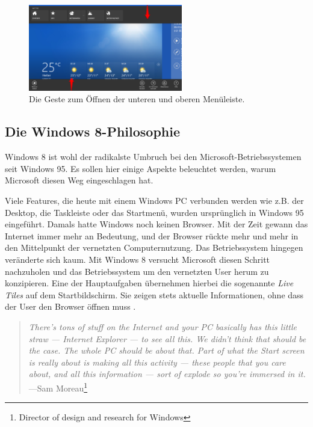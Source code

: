 \documentclass[12pt,a4paper,bibtotoc,abstracton]{scrartcl}
\begin{document}
\begin{figure}[h]	
	\centering
	\includegraphics[width=0.6\textwidth]{Bilder/Screenshots/windows8/app_leisten.png} 
	\caption{Die Geste zum Öffnen der unteren und oberen Menüleiste.}
	\label{fig:menubar}
\end{figure}  

\subsection{Die Windows 8-Philosophie}
\label{subsec:win8philosophie}
Windows 8 ist wohl der radikalste Umbruch bei den Microsoft-Betriebssystemen seit Windows 95. Es sollen hier einige Aspekte beleuchtet werden, warum Microsoft diesen Weg eingeschlagen hat.

Viele Features, die heute mit einem Windows PC verbunden werden wie z.B. der Desktop, die Taskleiste oder das Startmenü, wurden ursprünglich in Windows 95 eingeführt. Damals hatte Windows noch keinen Browser. Mit der Zeit gewann das Internet immer mehr an Bedeutung, und der Browser rückte mehr und mehr in den Mittelpunkt der vernetzten Computernutzung. Das Betriebssystem hingegen veränderte sich kaum. Mit Windows 8 versucht Microsoft diesen Schritt nachzuholen und das Betriebssystem um den vernetzten User herum zu konzipieren. Eine der Hauptaufgaben übernehmen hierbei die sogenannte \textit{Live Tiles} auf dem Startbildschirm. Sie zeigen stets aktuelle Informationen, ohne dass der User den Browser öffnen muss \citep{Pachal2012}. 

\begin{quote}
\textit{There's tons of stuff on the Internet and your PC basically has this little straw — Internet Explorer — to see all this. We didn't think that should be the case. The whole PC should be about that. Part of what the Start screen is really about is making all this activity — these people that you care about, and all this information — sort of explode so you're immersed in it.} ---Sam Moreau\footnote{Director of design and research for Windows}
\end{quote}
\end{document}
